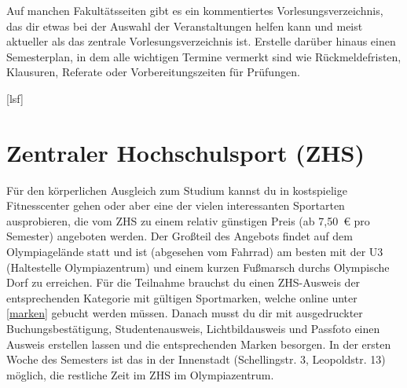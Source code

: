 Auf manchen Fakultätsseiten gibt es ein kommentiertes Vorlesungsverzeichnis, das dir etwas bei der Auswahl der Veranstaltungen helfen kann und meist aktueller als das zentrale Vorlesungsverzeichnis ist.
Erstelle darüber hinaus einen Semesterplan, in dem alle wichtigen Termine vermerkt sind wie Rückmeldefristen, Klausuren, Referate oder Vorbereitungszeiten für Prüfungen.

\begin{urlList}
	[lsf]
\end{urlList}

	




\section{Zentraler Hochschulsport (ZHS)}

Für den körperlichen Ausgleich zum Studium kannst du in kostspielige
Fitnesscenter gehen oder aber eine der vielen interessanten Sportarten
ausprobieren, die vom ZHS zu einem relativ günstigen Preis (ab 7,50~€ pro
Semester) angeboten werden. Der Großteil des Angebots findet auf dem
Olympiagelände statt und ist (abgesehen vom Fahrrad) am besten mit der U3
(Haltestelle Olympiazentrum) und einem kurzen Fußmarsch durchs Olympische Dorf
zu erreichen. Für die Teilnahme brauchst du einen ZHS-Ausweis der
entsprechenden Kategorie mit gültigen Sportmarken, welche online unter
\ref{marken} gebucht werden müssen. Danach musst du dir mit ausgedruckter
Buchungsbestätigung, Studentenausweis, Lichtbildausweis und Passfoto einen
Ausweis erstellen lassen und die entsprechenden Marken besorgen. In der ersten
Woche des Semesters ist das in der Innenstadt (Schellingstr. 3, Leopoldstr. 13)
möglich, die restliche Zeit im ZHS im Olympiazentrum. 

